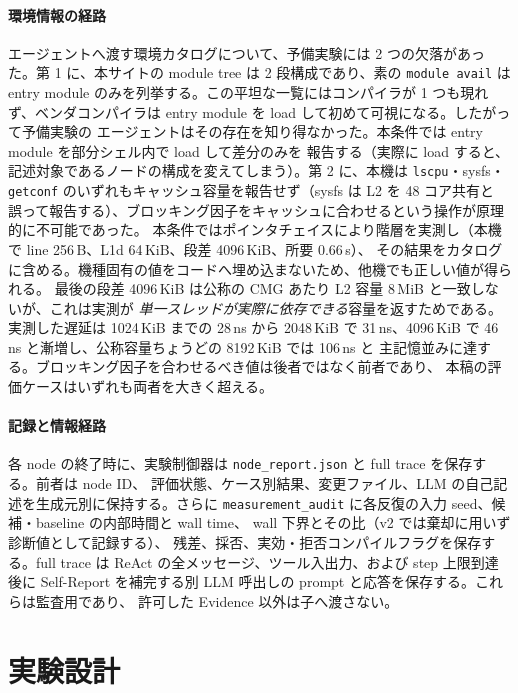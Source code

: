 \documentclass[conference,letterpaper]{IEEEtran}
\begin{document}
\paragraph{環境情報の経路}
エージェントへ渡す環境カタログについて、予備実験には 2 つの欠落があった。第 1 に、本サイトの module tree は
2 段構成であり、素の \texttt{module avail} は entry module のみを列挙する。この平坦な一覧にはコンパイラが
1 つも現れず、ベンダコンパイラは entry module を load して初めて可視になる。したがって予備実験の
エージェントはその存在を知り得なかった。本条件では entry module を部分シェル内で load して差分のみを
報告する（実際に load すると、記述対象であるノードの構成を変えてしまう）。第 2 に、本機は
\texttt{lscpu}・sysfs・\texttt{getconf} のいずれもキャッシュ容量を報告せず（sysfs は L2 を 48 コア共有と
誤って報告する）、ブロッキング因子をキャッシュに合わせるという操作が原理的に不可能であった。
本条件ではポインタチェイスにより階層を実測し（本機で line 256\,B、L1d 64\,KiB、段差 4096\,KiB、所要 0.66\,s）、
その結果をカタログに含める。機種固有の値をコードへ埋め込まないため、他機でも正しい値が得られる。
最後の段差 4096\,KiB は公称の CMG あたり L2 容量 8\,MiB と一致しないが、これは実測が
\emph{単一スレッドが実際に依存できる}容量を返すためである。実測した遅延は 1024\,KiB までの 28\,ns から
2048\,KiB で 31\,ns、4096\,KiB で 46\,ns と漸増し、公称容量ちょうどの 8192\,KiB では 106\,ns と
主記憶並みに達する。ブロッキング因子を合わせるべき値は後者ではなく前者であり、
本稿の評価ケースはいずれも両者を大きく超える。

\paragraph{記録と情報経路}
各 node の終了時に、実験制御器は \texttt{node\_report.json} と full trace を保存する。前者は node ID、
評価状態、ケース別結果、変更ファイル、LLM の自己記述を生成元別に保持する。さらに
\texttt{measurement\_audit} に各反復の入力 seed、候補・baseline の内部時間と wall time、
wall 下界とその比（v2 では棄却に用いず診断値として記録する）、
残差、採否、実効・拒否コンパイルフラグを保存する。full trace は ReAct の全メッセージ、ツール入出力、および
step 上限到達後に Self-Report を補完する別 LLM 呼出しの prompt と応答を保存する。これらは監査用であり、
許可した Evidence 以外は子へ渡さない。

\section{実験設計}
\end{document}
